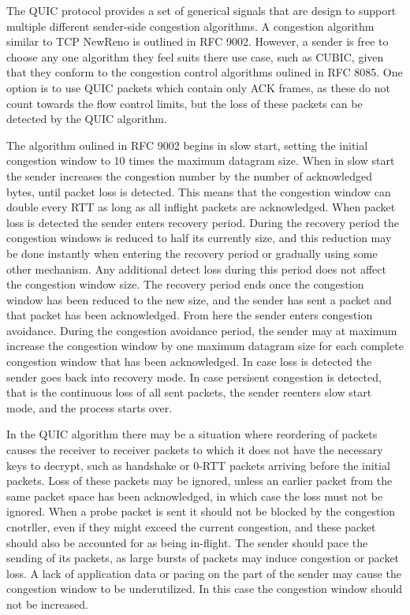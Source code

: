\documentclass[english, 12pt, a4paper, elec, utf8, a-2b, online]{aaltothesis}
\begin{document}
The QUIC protocol provides a set of generical signals that are design to support
multiple different sender-side congestion algorithms. A congestion algorithm similar
to TCP NewReno\cite{rfc6582} is outlined in RFC 9002. However, a sender is free to
choose any one algorithm they feel suits there use case, such as CUBIC, given that they conform
to the congestion control algorithms oulined in RFC 8085\cite{rfc8085}. One option
is to use QUIC packets which contain only ACK frames, as these do not count towards
the flow control limits, but the loss of these packets can be detected by the QUIC
algorithm\cite{rfc9002}.

The algorithm oulined in RFC 9002 begins in slow start, setting the initial congestion
window to 10 times the maximum datagram size. When in slow start the sender increases
the congestion number by the number of acknowledged bytes, until packet loss is detected. This
means that the congestion window can double every RTT as long as all inflight packets
are acknowledged. When packet loss is detected the sender enters recovery period.
During the recovery period the congestion windows is reduced to half its currently
size, and this reduction may be done instantly when entering the recovery period
or gradually using some other mechanism. Any additional detect loss during this
period does not affect the congestion window size. The recovery period ends once
the congestion window has been reduced to the new size, and the sender has sent
a packet and that packet has been acknowledged. From here the sender enters congestion 
avoidance. During the congestion avoidance period, the sender may at maximum increase
the congestion window by one maximum datagram size for each complete congestion
window that has been acknowledged. In case loss is detected the sender goes back
into recovery mode. In case persisent congestion is detected, that is the continuous
loss of all sent packets, the sender reenters slow start mode, and the process
starts over\cite{rfc9002}.

In the QUIC algorithm there may be a situation where reordering of packets causes
the receiver to receiver packets to which it does not have the necessary keys to
decrypt, such as handshake or 0-RTT packets arriving before the initial packets.
Loss of these packets may be ignored, unless an earlier packet from the same packet space
has been acknowledged, in which case the loss must not be ignored. When a probe
packet is sent it should not be blocked by the congestion cnotrller, even if they might exceed the current
congestion, and these packet should also be accounted for as being in-flight. The
sender should pace the sending of its packets, as large bursts of packets may induce 
congestion or packet loss. A lack of application data or pacing on the part of the
sender may cause the congestion window to be underutilized. In this case the congestion
window should not be increased\cite{rfc9002}.
\end{document}
